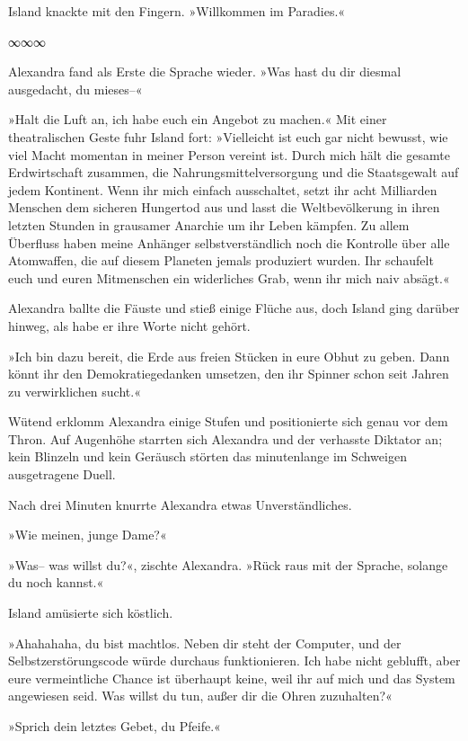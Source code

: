 Island knackte mit den Fingern. »Willkommen im Paradies.«

\begin{center}
∞∞∞
\end{center}

Alexandra fand als Erste die Sprache wieder. »Was hast du dir diesmal ausgedacht, du mieses–«

»Halt die Luft an, ich habe euch ein Angebot zu machen.« Mit einer theatralischen Geste fuhr Island fort: »Vielleicht ist euch gar nicht bewusst, wie viel Macht momentan in meiner Person vereint ist. Durch mich hält die gesamte Erdwirtschaft zusammen, die Nahrungsmittelversorgung und die Staatsgewalt auf jedem Kontinent. Wenn ihr mich einfach ausschaltet, setzt ihr acht Milliarden Menschen dem sicheren Hungertod aus und lasst die Weltbevölkerung in ihren letzten Stunden in grausamer Anarchie um ihr Leben kämpfen. Zu allem Überfluss haben meine Anhänger selbstverständlich noch die Kontrolle über alle Atomwaffen, die auf diesem Planeten jemals produziert wurden. Ihr schaufelt euch und euren Mitmenschen ein widerliches Grab, wenn ihr mich naiv absägt.«

Alexandra ballte die Fäuste und stieß einige Flüche aus, doch Island ging darüber hinweg, als habe er ihre Worte nicht gehört.

»Ich bin dazu bereit, die Erde aus freien Stücken in eure Obhut zu geben. Dann könnt ihr den Demokratiegedanken umsetzen, den ihr Spinner schon seit Jahren zu verwirklichen sucht.«

Wütend erklomm Alexandra einige Stufen und positionierte sich genau vor dem Thron. Auf Augenhöhe starrten sich Alexandra und der verhasste Diktator an; kein Blinzeln und kein Geräusch störten das minutenlange im Schweigen ausgetragene Duell.

Nach drei Minuten knurrte Alexandra etwas Unverständliches.

»Wie meinen, junge Dame?«

»Was– was willst du?«, zischte Alexandra. »Rück raus mit der Sprache, solange du noch kannst.«

Island amüsierte sich köstlich.

»Ahahahaha, du bist machtlos. Neben dir steht der Computer, und der Selbstzerstörungscode würde durchaus funktionieren. Ich habe nicht geblufft, aber eure vermeintliche Chance ist überhaupt keine, weil ihr auf mich und das System angewiesen seid. Was willst du tun, außer dir die Ohren zuzuhalten?«

»Sprich dein letztes Gebet, du Pfeife.«

